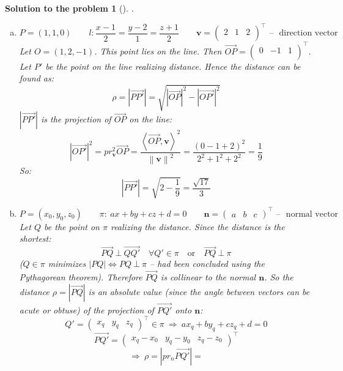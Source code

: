 \documentclass[12pt,a4]{article}
\newtheorem{solution}{Solution to the problem}
\newcommand{\bn}{{\mathbf n}}
\newcommand{\bv}{{\mathbf v}}
\newcommand{\sprod}[2]{\left \langle #1, #2 \right \rangle}
\newcommand{\norm}[1]{\left\lVert#1\right\rVert}
\newcommand{\abs}[1]{\left | #1 \right |}
\newcommand{\vect}[1]{\overrightarrow{#1}}
\begin{document}
\begin{solution}[]\rm .
\begin{enumerate}[(a)]		
\item
\[
P = (1, 1, 0)
\qquad
l: \frac{x-1}{2}=\frac{y-2}{1} = \frac{z+1}{2}
\qquad
\bv = \begin{pmatrix} 2 & 1 & 2 \\ \end{pmatrix}^\top
\text{ -- ~direction vector}
\]
Let
$O = (1, 2, -1)$.
This point lies on the line. Then $\vect{OP} =  \begin{pmatrix} 0 & -1 & 1 \\ \end{pmatrix}^\top$. Let $P'$ be the point on the line realizing distance. Hence the distance can be found as:
\[
\rho = \abs{\vect{PP'}} = \sqrt{\abs{\vect{OP}}^2 - \abs{\vect{OP'}}^2}
\]
$\abs{\vect{PP'}}$ is the projection of $\vect{OP}$ on the line:
\[
\abs{\vect{OP'}}^2 = 
pr^2_\bv \vect{OP} = 
\frac{\sprod{\vect{OP}}{\bv}^2}{\norm{\bv}^2} =
\frac{(0-1+2)^2}{2^2 + 1^2 + 2^2} = \frac{1}{9}
\]
So:
\[
\abs{\vect{PP'}} = \sqrt{2 - \frac{1}{9}} = \frac{\sqrt{17}}{3}
\]
\item 
\[
P = (x_0, y_0, z_0)
\qquad
\pi:~ ax + by + cz + d = 0
\qquad
\bn = \begin{pmatrix} a & b & c\end{pmatrix}^\top
\text{ -- ~normal vector}
\]
Let $Q$ be the point on $\pi$ realizing the distance. Since the distance is the shortest:
\[
\vect{PQ}~\bot~\vect{QQ'} \quad \forall Q' \in \pi \quad \text{or} \quad  \vect{PQ}~\bot~\pi 
\]
($Q \in \pi$ minimizes $\abs{PQ} \Leftrightarrow PQ~\bot~\pi$ -- had been concluded using the Pythagorean theorem).
Therefore $\vect{PQ}$ is collinear to the normal $\bn$.
So the distance $\rho=\abs{\vect{PQ}}$ is an absolute value (since the angle between vectors can be acute or obtuse) of the projection of $\vect{PQ'}$ onto $\bn$:
\[
Q' = \begin{pmatrix} x_q & y_q & z_q\end{pmatrix}^\top \in \pi
~\Rightarrow~
ax_q + by_q + cz_q + d = 0
\]
\[
\vect{PQ'} = \begin{pmatrix} x_q-x_0 & y_q-y_0 & z_q-z_0\end{pmatrix}^\top
\]
\[
\Rightarrow ~ \rho = \abs{pr_n \vect{PQ'}} =
\]
\end{enumerate}
\end{solution}
\end{document}
